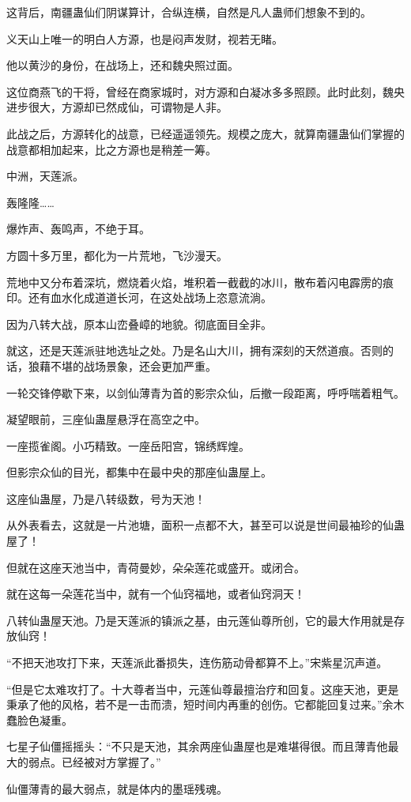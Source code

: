 \begin{this_body}
这背后，南疆蛊仙们阴谋算计，合纵连横，自然是凡人蛊师们想象不到的。

义天山上唯一的明白人方源，也是闷声发财，视若无睹。

他以黄沙的身份，在战场上，还和魏央照过面。

这位商燕飞的干将，曾经在商家城时，对方源和白凝冰多多照顾。此时此刻，魏央进步很大，方源却已然成仙，可谓物是人非。

此战之后，方源转化的战意，已经遥遥领先。规模之庞大，就算南疆蛊仙们掌握的战意都相加起来，比之方源也是稍差一筹。

中洲，天莲派。

轰隆隆……

爆炸声、轰鸣声，不绝于耳。

方圆十多万里，都化为一片荒地，飞沙漫天。

荒地中又分布着深坑，燃烧着火焰，堆积着一截截的冰川，散布着闪电霹雳的痕印。还有血水化成道道长河，在这处战场上恣意流淌。

因为八转大战，原本山峦叠嶂的地貌。彻底面目全非。

就这，还是天莲派驻地选址之处。乃是名山大川，拥有深刻的天然道痕。否则的话，狼藉不堪的战场景象，还会更加严重。

一轮交锋停歇下来，以剑仙薄青为首的影宗众仙，后撤一段距离，呼呼喘着粗气。

凝望眼前，三座仙蛊屋悬浮在高空之中。

一座揽雀阁。小巧精致。一座岳阳宫，锦绣辉煌。

但影宗众仙的目光，都集中在最中央的那座仙蛊屋上。

这座仙蛊屋，乃是八转级数，号为天池！

从外表看去，这就是一片池塘，面积一点都不大，甚至可以说是世间最袖珍的仙蛊屋了！

但就在这座天池当中，青荷曼妙，朵朵莲花或盛开。或闭合。

就在这每一朵莲花当中，就有一个仙窍福地，或者仙窍洞天！

八转仙蛊屋天池。乃是天莲派的镇派之基，由元莲仙尊所创，它的最大作用就是存放仙窍！

“不把天池攻打下来，天莲派此番损失，连伤筋动骨都算不上。”宋紫星沉声道。

“但是它太难攻打了。十大尊者当中，元莲仙尊最擅治疗和回复。这座天池，更是秉承了他的风格，若不是一击而溃，短时间内再重的创伤。它都能回复过来。”余木蠢脸色凝重。

七星子仙僵摇摇头：“不只是天池，其余两座仙蛊屋也是难堪得很。而且薄青他最大的弱点。已经被对方掌握了。”

仙僵薄青的最大弱点，就是体内的墨瑶残魂。


\end{this_body}
